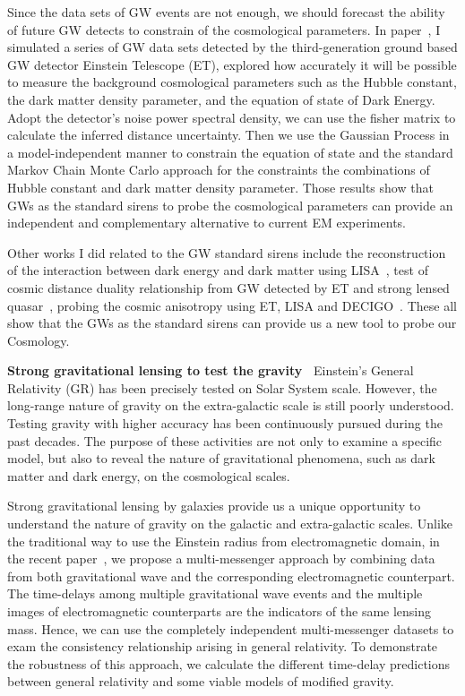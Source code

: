 \documentclass[11pt,letterpaper,sans]{moderncv}   %
\begin{document}
\vspace{2mm}
\noindent
Since the data sets of GW events are not enough, we should forecast the ability of future GW detects to constrain of the cosmological parameters. In paper~\cite{Cai:2016sby}, I simulated a series of GW data sets detected by the third-generation ground based GW detector Einstein Telescope (ET), explored
how accurately it will be possible to measure the background cosmological parameters such as the Hubble constant, the dark matter density parameter, and the equation of state of Dark Energy. Adopt the detector's noise power spectral density, we can use the fisher matrix to calculate the inferred distance uncertainty. Then we use the Gaussian Process in a model-independent manner to constrain the equation of state and the standard Markov Chain Monte Carlo approach for the constraints the combinations of Hubble constant and dark matter density parameter. Those
results show that GWs as the standard sirens to probe the cosmological parameters can provide an
independent and complementary alternative to current EM experiments.

\vspace{2mm}
\noindent
Other works I did related to the GW standard sirens include the reconstruction of the interaction between dark energy and dark matter using LISA~\cite{Cai:2017yww}, test of cosmic distance duality relationship from GW detected by ET and strong lensed quasar~\cite{Yang:2017bkv}, probing the cosmic anisotropy using ET, LISA and DECIGO~\cite{Cai:2017aea}. These all show that the GWs as the standard sirens can provide us a new tool to probe our Cosmology.

\vspace{2mm}
\noindent
\textcolor{color1}{\textbf{Strong gravitational lensing to test the gravity~\cite{Yang:2018bdf}}}
Einstein's General Relativity (GR) has been precisely tested on
Solar System scale. However, the long-range nature of gravity on the extra-galactic scale is still poorly
understood. Testing gravity with higher accuracy has been continuously pursued during the past decades. The purpose of these activities are not only  to examine
a specific model, but also to reveal the nature of gravitational phenomena, such as dark matter and dark energy, on the cosmological scales.

\vspace{2mm}
\noindent
Strong gravitational lensing by galaxies provide us a unique opportunity to understand the nature of gravity on the galactic and extra-galactic scales.
Unlike the traditional way to use the Einstein radius from electromagnetic domain, in the recent paper~\cite{Yang:2018bdf}, we propose a multi-messenger approach by combining data from both gravitational wave and the corresponding electromagnetic  counterpart.
The time-delays among multiple gravitational wave events and the multiple images of electromagnetic counterparts are the indicators of the same lensing mass.
Hence, we can use the completely independent multi-messenger datasets to exam the consistency relationship arising in  general relativity.
To demonstrate the robustness of this approach, we calculate the different time-delay predictions between general relativity and some viable models of modified gravity. 
\end{document}
